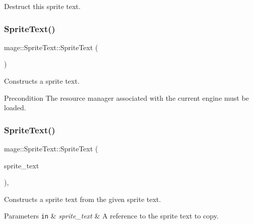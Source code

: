 Destruct this sprite text. \hypertarget{classmage_1_1_sprite_text_ae55645d53a2f774703603139a80dd84b}{}\label{classmage_1_1_sprite_text_ae55645d53a2f774703603139a80dd84b} 
\subsubsection{\texorpdfstring{Sprite\+Text()}{SpriteText()}\hspace{0.1cm}{\footnotesize\ttfamily [1/3]}}
{\footnotesize\ttfamily mage\+::\+Sprite\+Text\+::\+Sprite\+Text (\begin{DoxyParamCaption}{ }\end{DoxyParamCaption})\hspace{0.3cm}{\ttfamily [protected]}}

Constructs a sprite text.

\begin{DoxyPrecond}{Precondition}
The resource manager associated with the current engine must be loaded. 
\end{DoxyPrecond}
\hypertarget{classmage_1_1_sprite_text_a3e56a7882dd714a6d8f2452d4f7071ff}{}\label{classmage_1_1_sprite_text_a3e56a7882dd714a6d8f2452d4f7071ff} 
\subsubsection{\texorpdfstring{Sprite\+Text()}{SpriteText()}\hspace{0.1cm}{\footnotesize\ttfamily [2/3]}}
{\footnotesize\ttfamily mage\+::\+Sprite\+Text\+::\+Sprite\+Text (\begin{DoxyParamCaption}\item[{const \hyperlink{classmage_1_1_sprite_text}{Sprite\+Text} \&}]{sprite\+\_\+text }\end{DoxyParamCaption})\hspace{0.3cm}{\ttfamily [protected]}, {\ttfamily [default]}}

Constructs a sprite text from the given sprite text.


\begin{DoxyParams}[1]{Parameters}
\mbox{\tt in}  & {\em sprite\+\_\+text} & A reference to the sprite text to copy. \\
\hline
\end{DoxyParams}
\hypertarget{classmage_1_1_sprite_text_ab03ba1fb607ce86d28b742fc020c8a62}{}\label{classmage_1_1_sprite_text_ab03ba1fb607ce86d28b742fc020c8a62} 

